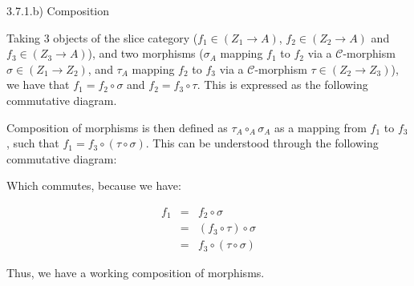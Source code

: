 3.7.1.b) Composition

Taking 3 objects of the slice category ($f_1 \in (Z_1 \to A)$, $f_2 \in (Z_2 \to A)$ and $f_3 \in (Z_3 \to A)$), and two morphisms ($\sigma_A$ mapping $f_1$ to $f_2$ via a $\mathcal{C}$-morphism $\sigma \in (Z_1 \to Z_2)$, and $\tau_A$ mapping $f_2$ to $f_3$ via a $\mathcal{C}$-morphism $\tau \in (Z_2 \to Z_3)$), we have that $f_1 = f_2 \circ \sigma$ and $f_2 = f_3 \circ \tau$. This is expressed as the following commutative diagram.


Composition of morphisms is then defined as $\tau_A \circ_A \sigma_A$ as a mapping from $f_1$ to $f_3$, such that $f_1 = f_3 \circ (\tau \circ \sigma)$. This can be understood through the following commutative diagram:


Which commutes, because we have:

$$
\begin{align}
	f_1 &=&  f_2             \circ \sigma  \\
		&=& (f_3 \circ \tau) \circ \sigma  \\
		&=&  f_3 \circ (\tau \circ \sigma)
\end{align}
$$

Thus, we have a working composition of morphisms.

